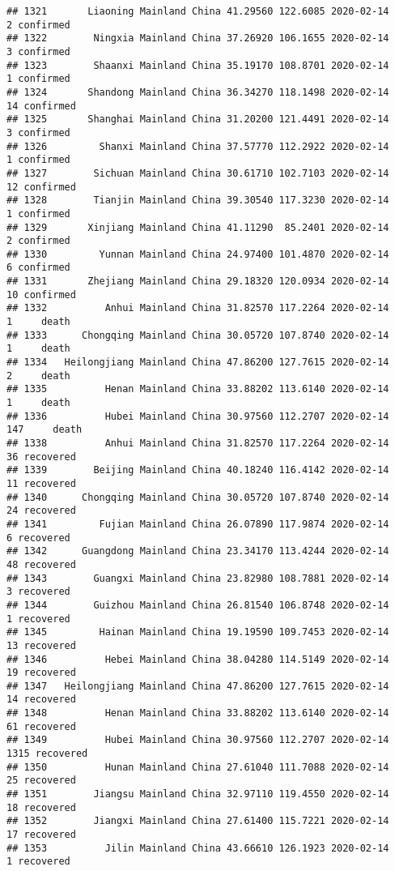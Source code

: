 \documentclass[
]{article}
\begin{document}
\begin{verbatim}
## 1321       Liaoning Mainland China 41.29560 122.6085 2020-02-14     2 confirmed
## 1322        Ningxia Mainland China 37.26920 106.1655 2020-02-14     3 confirmed
## 1323        Shaanxi Mainland China 35.19170 108.8701 2020-02-14     1 confirmed
## 1324       Shandong Mainland China 36.34270 118.1498 2020-02-14    14 confirmed
## 1325       Shanghai Mainland China 31.20200 121.4491 2020-02-14     3 confirmed
## 1326         Shanxi Mainland China 37.57770 112.2922 2020-02-14     1 confirmed
## 1327        Sichuan Mainland China 30.61710 102.7103 2020-02-14    12 confirmed
## 1328        Tianjin Mainland China 39.30540 117.3230 2020-02-14     1 confirmed
## 1329       Xinjiang Mainland China 41.11290  85.2401 2020-02-14     2 confirmed
## 1330         Yunnan Mainland China 24.97400 101.4870 2020-02-14     6 confirmed
## 1331       Zhejiang Mainland China 29.18320 120.0934 2020-02-14    10 confirmed
## 1332          Anhui Mainland China 31.82570 117.2264 2020-02-14     1     death
## 1333      Chongqing Mainland China 30.05720 107.8740 2020-02-14     1     death
## 1334   Heilongjiang Mainland China 47.86200 127.7615 2020-02-14     2     death
## 1335          Henan Mainland China 33.88202 113.6140 2020-02-14     1     death
## 1336          Hubei Mainland China 30.97560 112.2707 2020-02-14   147     death
## 1338          Anhui Mainland China 31.82570 117.2264 2020-02-14    36 recovered
## 1339        Beijing Mainland China 40.18240 116.4142 2020-02-14    11 recovered
## 1340      Chongqing Mainland China 30.05720 107.8740 2020-02-14    24 recovered
## 1341         Fujian Mainland China 26.07890 117.9874 2020-02-14     6 recovered
## 1342      Guangdong Mainland China 23.34170 113.4244 2020-02-14    48 recovered
## 1343        Guangxi Mainland China 23.82980 108.7881 2020-02-14     3 recovered
## 1344        Guizhou Mainland China 26.81540 106.8748 2020-02-14     1 recovered
## 1345         Hainan Mainland China 19.19590 109.7453 2020-02-14    13 recovered
## 1346          Hebei Mainland China 38.04280 114.5149 2020-02-14    19 recovered
## 1347   Heilongjiang Mainland China 47.86200 127.7615 2020-02-14    14 recovered
## 1348          Henan Mainland China 33.88202 113.6140 2020-02-14    61 recovered
## 1349          Hubei Mainland China 30.97560 112.2707 2020-02-14  1315 recovered
## 1350          Hunan Mainland China 27.61040 111.7088 2020-02-14    25 recovered
## 1351        Jiangsu Mainland China 32.97110 119.4550 2020-02-14    18 recovered
## 1352        Jiangxi Mainland China 27.61400 115.7221 2020-02-14    17 recovered
## 1353          Jilin Mainland China 43.66610 126.1923 2020-02-14     1 recovered

\end{verbatim}
\end{document}

